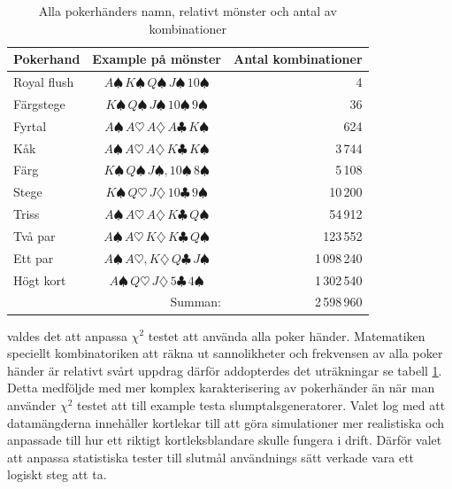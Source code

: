 \documentclass[swedish,a4paper]{article}
\begin{document}
\begin{table}[ht] 
\captionsetup{justification=centering,margin=4cm}
\caption{Alla pokerhänders namn, relativt mönster och antal av kombinationer }
\label{tab:all_poker_hands}
	\centering
	\begin{tabular}{|l|c|r|}
	
	\hline 
	Pokerhand 
	& Example på mönster 
	& Antal kombinationer 
	\\ \hline  

	Royal flush 
	& $A\spadesuit\, K\spadesuit\, Q\spadesuit\, J\spadesuit\, 10\spadesuit$
	& 4 
	\\ \hline

	Färgstege
	& $K\spadesuit\, Q\spadesuit\, J\spadesuit\, 10\spadesuit\, 9\spadesuit$
	& 36 
	\\ \hline

	Fyrtal 
	& $A\spadesuit\,A\heartsuit\,A\diamondsuit\,A\clubsuit\, K\spadesuit$ 
	& 624 
	\\ \hline

	Kåk 
	& $A\spadesuit\, A\heartsuit\, A\diamondsuit\, K\clubsuit\,K\spadesuit$ 
	& 3\,744
	\\ \hline

	Färg
	& $K\spadesuit\, Q\spadesuit\, J\spadesuit, 10\spadesuit\, 8\spadesuit$
	& 5\,108
	\\ \hline

	Stege 
	& $K\spadesuit\, Q\heartsuit\, J\diamondsuit\, 10\clubsuit\,9\spadesuit$ 
	& 10\,200
	\\ \hline
	Triss 
	& $A\spadesuit\, A\heartsuit\, A\diamondsuit\, K\clubsuit\, Q\spadesuit$
	& 54\,912
	\\ \hline

	Två par 
	& $A\spadesuit\, A\heartsuit\, K\diamondsuit\, K\clubsuit\, Q\spadesuit$
	& 123\,552
	\\ \hline

	Ett par 
	& $A\spadesuit\, A\heartsuit, K\diamondsuit\, Q\clubsuit\, J\spadesuit$ 
	& 1\,098\,240 
	\\ \hline

	Högt kort
	& $A\spadesuit\, Q\heartsuit\, J\diamondsuit\, 5\clubsuit\, 4\spadesuit$
	& 1\,302\,540
	\\ \hline

	 
	\multicolumn{2}{|r|}{Summan:} 
	& 2\,598\,960 
	\\ \hline
\end{tabular}
\end{table}

valdes det att anpassa $\chi^2$ testet att använda alla poker händer. Matematiken
speciellt kombinatoriken att räkna ut sannolikheter och frekvensen av alla poker\-
händer är relativt svårt uppdrag därför addopterdes det \textcite{Drew2006} 
uträkningar se tabell \ref{tab:all_poker_hands}. Detta medföljde med mer komplex
karakterisering av poker\-händer än när man använder $\chi^2$ testet 
att till example testa slumptalsgeneratorer. Valet log med att datamängderna 
innehåller kortlekar till att göra simulationer mer  realistiska och anpassade
till hur ett riktigt kortleksblandare skulle fungera i drift. Därför valet att
anpassa statistiska tester till slutmål användnings sätt verkade vara ett
logiskt steg att ta.
\end{document}
